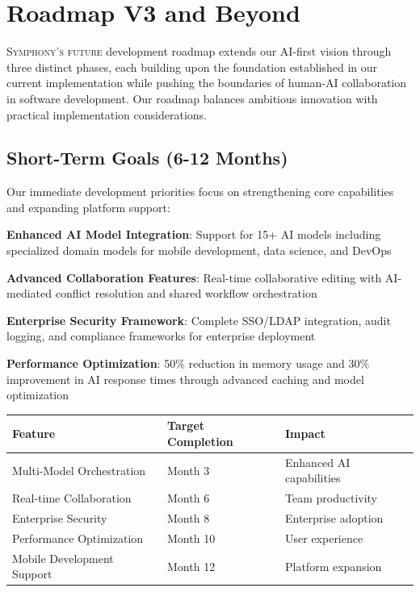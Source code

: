 
\section*{Roadmap V3 and Beyond}

\lettrine{S}{ymphony's future} development roadmap extends our AI-first vision through three distinct phases, each building upon the foundation established in our current implementation while pushing the boundaries of human-AI collaboration in software development. Our roadmap balances ambitious innovation with practical implementation considerations.

\subsection*{Short-Term Goals (6-12 Months)}

Our immediate development priorities focus on strengthening core capabilities and expanding platform support:

\begin{expandedlist}
    \item \textbf{Enhanced AI Model Integration}: Support for 15+ AI models including specialized domain models for mobile development, data science, and DevOps
    \item \textbf{Advanced Collaboration Features}: Real-time collaborative editing with AI-mediated conflict resolution and shared workflow orchestration
    \item \textbf{Enterprise Security Framework}: Complete SSO/LDAP integration, audit logging, and compliance frameworks for enterprise deployment
    \item \textbf{Performance Optimization}: 50\% reduction in memory usage and 30\% improvement in AI response times through advanced caching and model optimization
\end{expandedlist}

\begin{center}
\begin{tabular}{@{}lll@{}}
\toprule
\textbf{Feature} & \textbf{Target Completion} & \textbf{Impact} \\
\midrule
Multi-Model Orchestration & Month 3 & Enhanced AI capabilities \\
Real-time Collaboration & Month 6 & Team productivity \\
Enterprise Security & Month 8 & Enterprise adoption \\
Performance Optimization & Month 10 & User experience \\
Mobile Development Support & Month 12 & Platform expansion \\
\bottomrule
\end{tabular}
\end{center}

